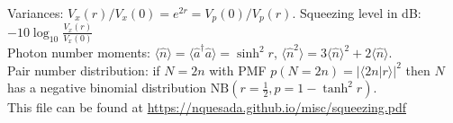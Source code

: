 \documentclass[12pt,letterpaper]{article}
\newcommand{\braket}[1]{\langle #1 \rangle}
\begin{document}
\begin{table}[!h]
{Variances: $V_x(r)/V_x(0) = e^{2r} = V_p(0)/V_p(r)$.  Squeezing level in dB: $-10 \log_{10} \frac{V_x(r)}{V_x(0)}$ \\
Photon number moments: $\langle \hat n \rangle  = \langle \hat a^\dagger \hat a \rangle  = \sinh^2 r$, $\langle \hat n^2 \rangle = 3 \langle \hat n \rangle ^2 + 2 \langle \hat n \rangle$. \\
Pair number distribution: if $N=2n$ with PMF $p(N=2n) = |\braket{2n|r}|^2$ then $N$ has a negative binomial distribution $\text{NB}\left(r=\tfrac{1}{2},p = 1-\tanh^2 r\right)$. \\
This file can be found at \url{https://nquesada.github.io/misc/squeezing.pdf}
}

\end{table}
\end{document}
